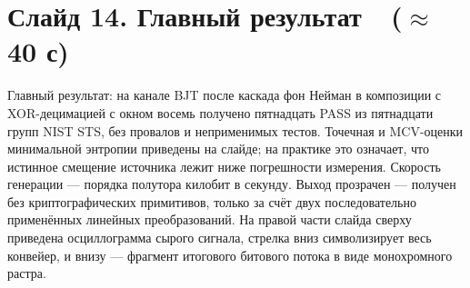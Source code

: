 \documentclass[12pt,a4paper]{extarticle}
\begin{document}
\section*{Слайд 14. Главный результат~~($\approx$\,40 с)}

Главный результат: на канале BJT после каскада фон Нейман в композиции с
XOR-децимацией с окном восемь получено пятнадцать PASS из пятнадцати групп
NIST STS, без провалов и неприменимых тестов. Точечная и MCV-оценки
минимальной энтропии приведены на слайде; на практике это означает, что
истинное смещение источника лежит ниже погрешности измерения. Скорость
генерации --- порядка полутора килобит в секунду. Выход прозрачен ---
получен без криптографических примитивов, только за счёт двух
последовательно применённых линейных преобразований. На правой части слайда
сверху приведена осциллограмма сырого сигнала, стрелка вниз символизирует
весь конвейер, и внизу --- фрагмент итогового битового потока в виде
монохромного растра.
\end{document}
